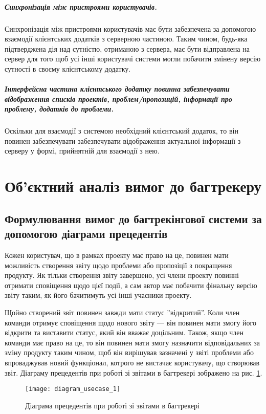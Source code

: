 \documentclass[../main.tex]{subfiles}
\begin{document}
	\subparagraph{Синхронізація між пристроями користувачів.}
		Синхронізація між пристроями користувачів має бути забезпечена за допомогою взаємодії клієнтських додатків з серверною частиною. Таким чином, будь-яка підтверджена дія над сутністю, отриманою з сервера, має бути відправлена на сервер для того щоб усі інші користувачі системи могли побачити змінену версію сутності в своєму клієнтському додатку.
	
	\subparagraph{Інтерфейсна частина клієнтського додатку повинна забезпечувати відображення списків проектів, проблем/пропозицій, інформації про проблему, додатків до проблеми.}
		Оскільки для взаємодії з системою необхідний клієнтський додаток, то він повинен забезпечувати забезпечувати відображення актуальної інформації з серверу у формі, прийнятній для взаємодії з нею.

\section{Об'єктний аналіз вимог до багтрекеру}

	\subsection{Формулювання вимог до багтрекінгової системи за допомогою діаграми прецедентів}
		Кожен користувач, що в рамках проекту має право на це, повинен мати можливість створення звіту щодо проблеми або пропозіції з покращення продукту. Як тільки створення звіту завершено, усі члени проекту повинні отримати сповіщення щодо цієї події, а сам автор має побачити фінальну версію звіту таким, як його бачитимуть усі інші учасники проекту.
		
		Щойно створений звіт повинен завжди мати статус ''відкритий''. Коли член команди отримує сповіщення щодо нового звіту — він повинен мати змогу його відкрити та виставити статус, який він вважає доцільним. Також, якщо член команди має право на це, то він повинен мати змогу назначити відповідальних за зміну продукту таким чином, щоб він вирішував зазначені у звіті проблеми або впроваджував новий функціонал, котрого не вистачає користувачу, що створював звіт. Діаграму прецедентів при роботі зі звітами в багтрекері зображено на рис. \ref{diag_usecase}.
		
		\begin{figure}[H]
			\centering
			\texttt{[image: diagram\_usecase\_1]}
			\caption{Діаграма прецедентів при роботі зі звітами в багтрекері}
			\label{diag_usecase}
		\end{figure}
	
\end{document}
